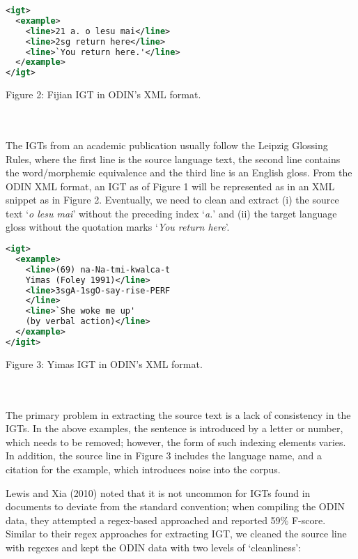 \documentclass[11pt]{article}
\begin{document}
\begin{minipage}{\columnwidth}
\begin{lstlisting}[language=XML]
<igt>
  <example>
    <line>21 a. o lesu mai</line>
    <line>2sg return here</line>
    <line>`You return here.'</line>
  </example>
</igt>
\end{lstlisting} 
\centerline{Figure 2: Fijian IGT in ODIN's XML format.}
\end{minipage}
\\ \\
\noindent The IGTs from an academic publication usually follow the Leipzig Glossing Rules, where the first line is the source language text, the second line contains the word/morphemic equivalence and the third line is an English gloss. From the ODIN XML format, an IGT as of Figure 1 will be represented as in an XML snippet as in Figure 2. Eventually, we need to clean and extract (i) the source text `\emph{o lesu mai}' without the preceding index `\emph{a.}' and (ii) the target language gloss without the quotation marks `\emph{You return here}'.
\begin{minipage}{\columnwidth}
\begin{lstlisting}[language=XML]
<igt>
  <example>
    <line>(69) na-Na-tmi-kwalca-t 
    Yimas (Foley 1991)</line>
    <line>3sgA-1sgO-say-rise-PERF
    </line>
    <line>`She woke me up' 
    (by verbal action)</line>
  </example>
</igit>
\end{lstlisting} 
\smallskip
\centerline{Figure 3: Yimas IGT in ODIN's XML format.}
\end{minipage}
\\ \\
\noindent The primary problem in extracting the source text is a lack of consistency in the IGTs. In the above examples, the sentence is introduced by a letter or number, which needs to be removed; however, the form of such indexing elements varies. In addition, the source line in Figure 3 includes the language name, and a citation for the example, which introduces noise into the corpus.

Lewis and Xia (2010) noted that it is not uncommon for IGTs found in documents to deviate from the standard convention; when compiling the ODIN data, they attempted a regex-based approached and reported 59\% F-score. Similar to their regex approaches for extracting IGT, we cleaned the source line with regexes and kept the ODIN data with two levels of `cleanliness':
\end{document}
